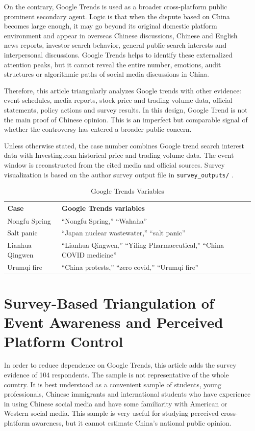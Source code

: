 \documentclass[conference]{IEEEtran}
\begin{document}
On the contrary, Google Trends is used as a broader cross-platform public prominent secondary agent. Logic is that when the dispute based on China becomes large enough, it may go beyond its original domestic platform environment and appear in overseas Chinese discussions, Chinese and English news reports, investor search behavior, general public search interests and interpersonal discussions. Google Trends helps to identify these externalized attention peaks, but it cannot reveal the entire number, emotions, audit structures or algorithmic paths of social media discussions in China.

Therefore, this article triangularly analyzes Google trends with other evidence: event schedules, media reports, stock price and trading volume data, official statements, policy actions and survey results. In this design, Google Trend is not the main proof of Chinese opinion. This is an imperfect but comparable signal of whether the controversy has entered a broader public concern.

Unless otherwise stated, the case number combines Google trend search interest data with Investing.com historical price and trading volume data. The event window is reconstructed from the cited media and official sources. Survey visualization is based on the author survey output file in \texttt{survey\_outputs/} \cite{googletrendsfaq,investinghistorical}.

\begin{table}[t]
\centering
\caption{Google Trends Variables}
\label{tab:trends_variables}
\footnotesize
\begin{tabular}{p{}p{}}
\toprule
Case & Google Trends variables \\
\midrule
Nongfu Spring & ``Nongfu Spring,'' ``Wahaha'' \\
Salt panic & ``Japan nuclear wastewater,'' ``salt panic'' \\
Lianhua Qingwen & ``Lianhua Qingwen,'' ``Yiling Pharmaceutical,'' ``China COVID medicine'' \\
Urumqi fire & ``China protests,'' ``zero covid,'' ``Urumqi fire'' \\
\bottomrule
\end{tabular}
\end{table}
\FloatBarrier

\section{Survey-Based Triangulation of Event Awareness and Perceived Platform Control}
In order to reduce dependence on Google Trends, this article adds the survey evidence of 104 respondents. The sample is not representative of the whole country. It is best understood as a convenient sample of students, young professionals, Chinese immigrants and international students who have experience in using Chinese social media and have some familiarity with American or Western social media. This sample is very useful for studying perceived cross-platform awareness, but it cannot estimate China's national public opinion.
\end{document}
